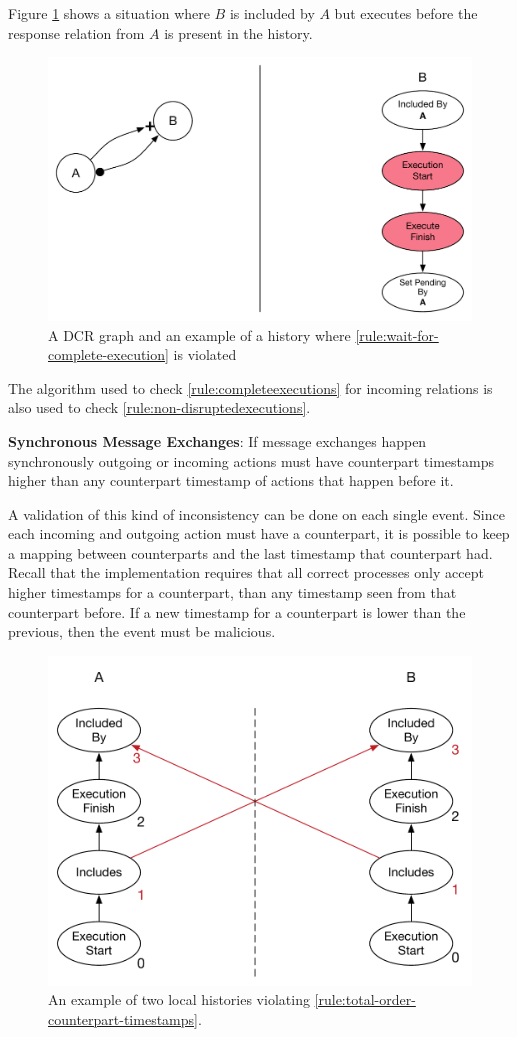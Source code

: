 	\noindent Figure \ref{fig:validation:wait-for-complete-execution} shows a situation where $B$ is included by $A$ but executes before the response relation from $A$ is present in the history.
	
	\begin{figure}[H]
		\centering
		\includegraphics[width=.7\textwidth]{6validation/images/wait-for-complete-execution.pdf}
		\caption{A DCR graph and an example of a history where \autoref{rule:wait-for-complete-execution} is violated}
		\label{fig:validation:wait-for-complete-execution}
	\end{figure}
	
	\noindent The algorithm used to check \autoref{rule:completeexecutions} for incoming relations is also used to check \autoref{rule:non-disruptedexecutions}.
		
	\begin{ruledef}
		\textbf{Synchronous Message Exchanges}: If message exchanges happen synchronously outgoing or incoming actions must have counterpart timestamps higher than any counterpart timestamp of actions that happen before it.
		\label{rule:total-order-counterpart-timestamps}
	\end{ruledef}
	
	\noindent A validation of this kind of inconsistency can be done on each single event. Since each incoming and outgoing action must have a counterpart, it is possible to keep a mapping between counterparts and the last timestamp that counterpart had. Recall that the implementation requires that all correct processes only accept higher timestamps for a counterpart, than any timestamp seen from that counterpart before. If a new timestamp for a counterpart is lower than the previous, then the event must be malicious.
	
	\begin{figure}[H]
		\centering
		\includegraphics[width=.5\textwidth]{6validation/images/total-order-of-counterpart-timestamps-cycle.pdf}
		\caption{An example of two local histories violating \autoref{rule:total-order-counterpart-timestamps}.}
		\label{fig:validation:total-order-of-counterpart-timestamps}
	\end{figure}
	
